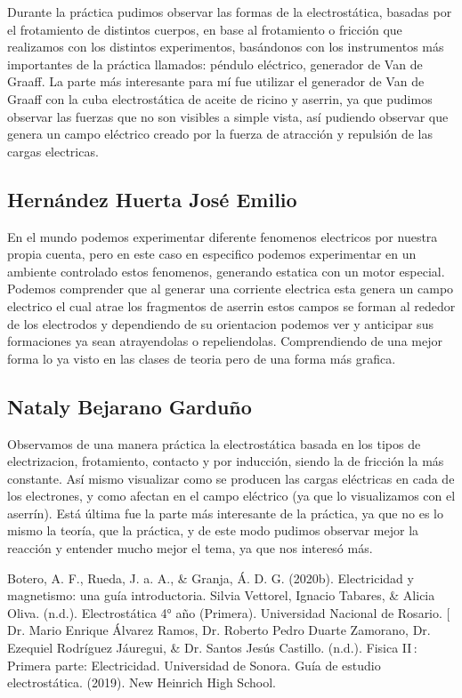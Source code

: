 \documentclass[14pt]{article}
\begin{document}
Durante la práctica pudimos observar las formas de la electrostática, basadas por el frotamiento de distintos cuerpos, en base al frotamiento o fricción que realizamos con los distintos experimentos, basándonos con los instrumentos más importantes de la práctica llamados: péndulo eléctrico, generador de Van de Graaff. La parte más interesante para mí fue utilizar el generador de Van de Graaff con la cuba electrostática de aceite de ricino y aserrin, ya que pudimos observar las fuerzas que no son visibles a simple vista, así pudiendo observar que genera un campo eléctrico creado por la fuerza de atracción y repulsión de las cargas electricas.

\subsection{Hernández Huerta José Emilio}
En el mundo podemos experimentar diferente fenomenos electricos por nuestra propia cuenta, pero en este caso en especifico podemos experimentar en un ambiente controlado estos fenomenos, generando estatica con un motor especial. 
Podemos comprender que al generar una corriente electrica esta genera un campo electrico el cual atrae los fragmentos de aserrin estos campos se forman al rededor de los electrodos y dependiendo de su orientacion podemos ver y anticipar sus formaciones ya sean atrayendolas o repeliendolas. Comprendiendo de una mejor forma lo ya visto en las clases de teoria pero de una forma más grafica.

\subsection{Nataly Bejarano Garduño}
Observamos de una manera práctica la electrostática basada en los tipos de electrizacion, frotamiento, contacto y por inducción, siendo la de fricción la más constante.
Así mismo visualizar como se producen las cargas eléctricas en cada de los electrones, y como afectan en el campo eléctrico (ya que lo visualizamos con el aserrín).
Está última fue la parte más interesante de la práctica, ya que no es lo mismo la teoría, que la práctica, y de este modo pudimos observar mejor la reacción y entender mucho mejor el tema, ya que nos interesó más.

\clearpage
\newpage	
	\begin{thebibliography}{0}
		Botero, A. F., Rueda, J. a. A., \& Granja, Á. D. G. (2020b). Electricidad y magnetismo: una guía introductoria.
		Silvia Vettorel, Ignacio Tabares, \& Alicia Oliva. (n.d.). Electrostática 4° año (Primera). Universidad Nacional de Rosario.
		[ Dr. Mario Enrique Álvarez Ramos, Dr. Roberto Pedro Duarte Zamorano, Dr. Ezequiel Rodríguez Jáuregui, \& Dr. Santos Jesús Castillo. (n.d.). Fisica II : Primera parte: Electricidad. Universidad de Sonora.
		Guía de estudio electrostática. (2019). New Heinrich High School.
	\end{thebibliography}
\end{document}
